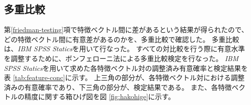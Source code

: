 \documentclass[titlepage,12pt]{jreport}
\newcommand{\wa}{\cdot}
\begin{document}
%

\subsection{多重比較\label{multiple-comparison}}
第\ref{friedman-testing}項で特徴ベクトル間に差があるという結果が得られたので、どの特徴ベクトル間に有意差があるのかを、多重比較で確認した。 多重比較は、{\it IBM SPSS Statics}を用いて行なった。 すべての対比較を行う際に有意水準を調整するために、ボンフェローニ法による多重比較検定を行なった。 {\it IBM SPSS Statics}を用いて求めた各特徴ベクトル対の調整済み有意確率と検定結果を表 \ref{tab:feature-conc}に示す。 上三角の部分が、各特徴ベクトル対における調整済みの有意確率であり、下三角の部分が、検定結果である。  また、各特徴ベクトルの精度に関する箱ひげ図を図 \ref{fig:hakohige}に示す。
\end{document}
